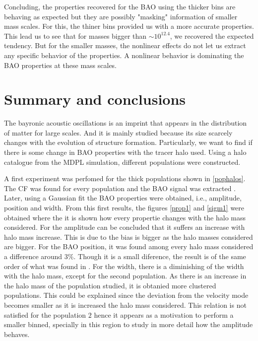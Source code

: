 Concluding, the properties recovered for the BAO using the thicker bins are behaving
as expected but they are possibly "masking" information of smaller mass scales. For this, 
the thiner bins provided us with a more accurate properties. This lead us to see that
for masses bigger than $\sim 10^{12.4}$, we recovered the expected tendency. But for
the smaller masses, the nonlinear effects do not let us extract any specific behavior
of the properties. A nonlinear behavior is dominating the BAO properties at these mass
scales. 

\section{Summary and conclusions}

The bayronic acoustic oscillations is an imprint that appears in the distribution of matter 
for large scales. And it is mainly studied because its size scarcely changes with the evolution of
structure formation. Particularly, we want to find if there is some change in BAO properties with 
the tracer halo used.
Using a halo catalogue from the MDPL simulation, different populations were 
constructed. 

A first experiment was perfomed for the thick populations shown in \ref{pophalos}.
The CF was found for every population and the BAO signal was extracted . 
Later, using a Gaussian fit the BAO properties were obtained, i.e., amplitude, position 
and width. 
From this first results, the figures \ref{prop1} and \ref{sigm1} were obtained where
the it is shown how every propertie changes with the halo mass considered. 
For the amplitude can be concluded that it suffers an increase
with halo mass increase. This is due to the bias is bigger as the halo masses considered
are bigger. 
For the BAO position, it was found among every halo mass considered a difference around $3\%$.
Though it is a small diference, the result is of the same order of what was found in 
\cite{motion}. 
For the width, there is a diminishing of the width with the halo mass, except for the second 
population. As there is an increase in the halo mass of the population studied, it is obtanied
more clustered populations. This could be explained since the deviation from the velocity 
mode becomes smaller as it is increased the halo mass considered. 
This relation is not satisfied for the population $2$	 hence it appears as a motivation to
perform a smaller binned, specially in this region to study in more detail how the 
amplitude behaves.
	
